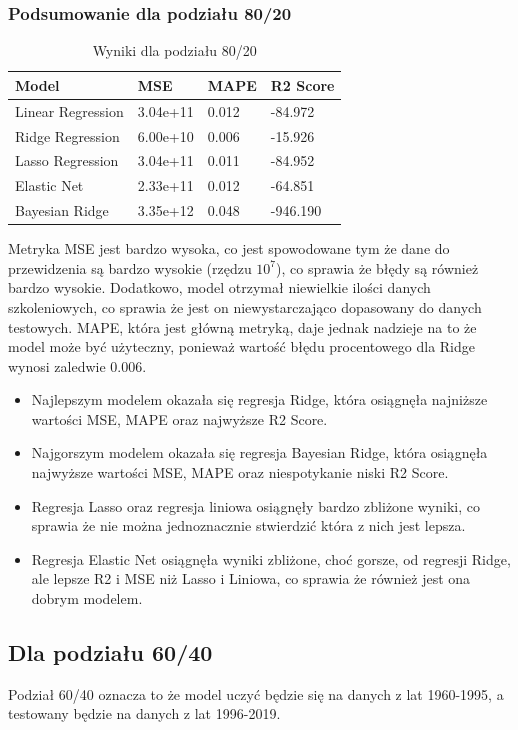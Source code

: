 \documentclass[11pt]{article}
\begin{document}
\subsubsection{Podsumowanie dla podziału 80/20}
\begin{table}[H]
        \centering
        \begin{tabular}{|l|l|l|l|}
        \hline
        Model & MSE & MAPE & R2 Score \\ \hline
        Linear Regression & 3.04e+11 & 0.012 & -84.972 \\ \hline
        Ridge Regression & 6.00e+10 & 0.006 & -15.926 \\ \hline
        Lasso Regression & 3.04e+11 & 0.011 & -84.952 \\ \hline
        Elastic Net & 2.33e+11 & 0.012 & -64.851 \\ \hline
        Bayesian Ridge & 3.35e+12 & 0.048 & -946.190 \\ \hline
        \end{tabular}
        \caption{Wyniki dla podziału 80/20}
\end{table}
Metryka MSE jest bardzo wysoka, co jest spowodowane tym że dane do przewidzenia są bardzo wysokie (rzędzu $10^7$), co sprawia że błędy są również bardzo wysokie.
Dodatkowo, model otrzymał niewielkie ilości danych szkoleniowych, co sprawia że jest on niewystarczająco dopasowany do danych testowych.
MAPE, która jest główną metryką, daje jednak nadzieje na to że model może być użyteczny, ponieważ wartość błędu procentowego dla Ridge wynosi zaledwie 0.006.
\begin{itemize}
        \item Najlepszym modelem okazała się regresja Ridge, która osiągnęła najniższe wartości MSE, MAPE oraz najwyższe R2 Score.
        \item Najgorszym modelem okazała się regresja Bayesian Ridge, która osiągnęła najwyższe wartości MSE, MAPE oraz niespotykanie niski R2 Score.
        \item Regresja Lasso oraz regresja liniowa osiągnęły bardzo zbliżone wyniki, co sprawia że nie można jednoznacznie stwierdzić która z nich jest lepsza.
        \item Regresja Elastic Net osiągnęła wyniki zbliżone, choć gorsze, od regresji Ridge, ale lepsze R2 i MSE niż Lasso i Liniowa, co sprawia że również jest ona dobrym modelem.
\end{itemize}
\subsection{Dla podziału 60/40}
Podział 60/40 oznacza to że model uczyć będzie się na danych z lat 1960-1995, a testowany będzie na danych z lat 1996-2019.
\end{document}
